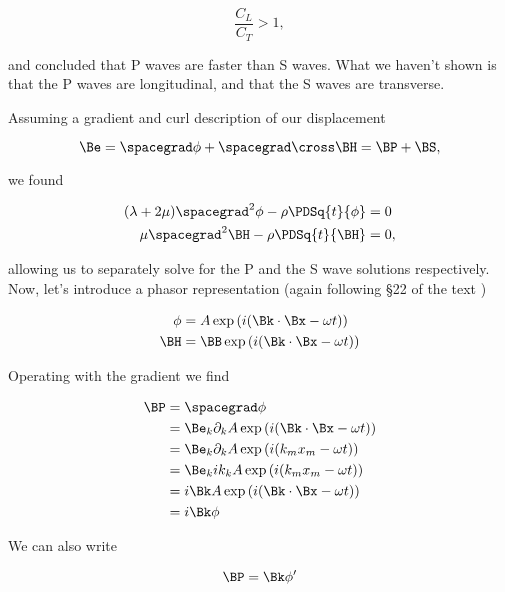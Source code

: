 \begin{equation}\label{eqn:continuumL8:n}
\frac{C_L}{C_T} > 1,
\end{equation}

and concluded that P waves are faster than S waves.  What we haven't shown is that the P waves are longitudinal, and that the S waves are transverse.

Assuming a gradient and curl description of our displacement

\begin{equation}\label{eqn:continuumL8:n}
\Be = \spacegrad \phi + \spacegrad \cross \BH = \BP + \BS,
\end{equation}

we found

\begin{align}\label{eqn:continuumL8:n}
(\lambda + 2 \mu) \spacegrad^2 \phi - \rho \PDSq{t}{\phi} &= 0 \\
\mu \spacegrad^2 \BH - \rho \PDSq{t}{\BH} &= 0,
\end{align}

allowing us to separately solve for the P and the S wave solutions respectively.  Now, let's introduce a phasor representation (again following \S 22 of the text \cite{landau1960theory})

\begin{align}\label{eqn:continuumL8:n}
\phi &= A \exp\left( i ( \Bk \cdot \Bx - \omega t) \right) \\
\BH &= \BB \exp\left( i ( \Bk \cdot \Bx - \omega t) \right)
\end{align}

Operating with the gradient we find

\begin{align*}
\BP
&= \spacegrad \phi \\
&= \Be_k \partial_k A \exp\left( i ( \Bk \cdot \Bx - \omega t) \right) \\
&= \Be_k \partial_k A \exp\left( i ( k_m x_m - \omega t) \right) \\
&= \Be_k i k_k A \exp\left( i ( k_m x_m - \omega t) \right) \\
&= i \Bk A \exp\left( i ( \Bk \cdot \Bx - \omega t) \right) \\
&= i \Bk \phi
\end{align*}

We can also write

\begin{equation}\label{eqn:continuumL8:n}
\BP = \Bk \phi'
\end{equation}

